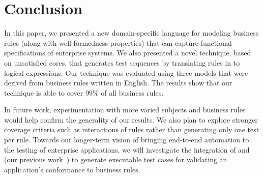 \section{Conclusion}

In this paper, we presented a new domain-specific language for modeling business
rules (along with well-formedness properties) that can capture functional 
specifications of enterprise systems. 
We also presented a novel technique, based on unsatisfied cores, that generates test
sequences by translating rules in to logical expressions.
Our technique was evaluated using three models that were derived from business
rules written in English. The results show that our technique is able to cover
99\% of all business rules.

In future work, experimentation with more varied subjects and business rules
would help confirm the generality of our results. We also plan to explore
stronger coverage criteria such as interactions of rules rather than generating
only one test per rule. Towards our longer-term vision
of bringing end-to-end automation to the testing of enterprise applications, we
will investigate the integration of \tool{} and \wateg{} (our previous
work~\cite{Thummalapenta:2013}) to generate executable test cases for validating
an application's conformance to business rules.

